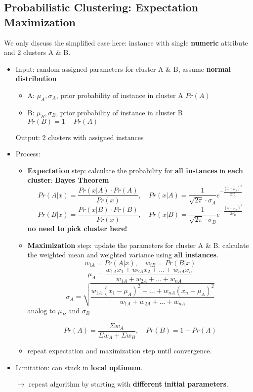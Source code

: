 \subsection{Probabilistic Clustering: Expectation Maximization}
We only discuss the simplified case here: instance with single \textbf{numeric} attribute and 2 clusters A \& B.
\begin{itemize}
	\item Input: random assigned parameters for cluster A \& B, assume \textbf{normal distribution}
	\begin{itemize}
		\item A: $\mu_A, \sigma_A$, prior probability of instance in cluster A $Pr(A)$
		\item B: $\mu_B, \sigma_B$, prior probability of instance in cluster B $Pr(B) = 1 - Pr(A)$
	\end{itemize}
	Output: 2 clusters with assigned instances
	
	\item Process:
	\begin{itemize}
		\item \textbf{Expectation} step: calculate the probability for \textbf{all instances} in \textbf{each cluster}: \textbf{Bayes Theorem}
			$$Pr(A|x) = \frac{Pr(x|A) \cdot Pr(A)}{Pr(x)} ,\quad Pr(x|A) = \frac{1}{\sqrt{2\pi} \cdot \sigma_A} e^{-\frac{(x - \mu_A)^2}{2\sigma_A^2}}$$
			$$Pr(B|x) = \frac{Pr(x|B) \cdot Pr(B)}{Pr(x)} ,\quad Pr(x|B) = \frac{1}{\sqrt{2\pi} \cdot \sigma_B} e^{-\frac{(x - \mu_B)^2}{2\sigma_B^2}}$$
		\textbf{no need to pick cluster here!}
		\item \textbf{Maximization} step: update the parameters for cluster A \& B. calculate the weighted mean and weighted variance using \textbf{all instances}. 
		$$w_{iA} = Pr(A|x), \quad  w_{iB} = Pr(B|x)$$
		$$\mu_A = \frac{w_{1A}x_1 + w_{2A}x_2 + \dots + w_{nA}x_n}{w_{1A} + w_{2A} + \dots + w_{nA}}$$
		$$\sigma_A = \sqrt{\frac{w_{1A} (x_1 - \mu_A)^2 + \dots + w_{nA} (x_n - \mu_A)^2}{w_{1A} + w_{2A} + \dots + w_{nA}}}$$
		analog to $\mu_B$ and $\sigma_B$
		
		$$Pr(A) = \frac{\Sigma w_A}{\Sigma w_A + \Sigma w_B}, \quad Pr(B) = 1 - Pr(A)$$
		\item repeat expectation and maximization step until convergence.
	\end{itemize}
	\item Limitation: can stuck in \textbf{local optimum}. 
	
	$\rightarrow$ repeat algorithm by starting with \textbf{different initial parameters}.
	

\end{itemize}
